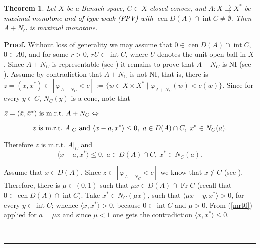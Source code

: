 \documentclass[english]{article}
\newtheorem{theorem}{Theorem}
\newenvironment{proof}[1][Proof]{\noindent\textbf{#1.} }{\ \rule{0.5em}{0.5em}}
\begin{document}
\begin{theorem} \label{T1}Let $X$ be a Banach space, $C\subset X$
closed convex, and $A:X\rightrightarrows X^{*}$ be \textcolor{black}{maximal
monotone and of type weak-(FPV) with} $\operatorname*{cen}D(A)\cap\operatorname*{int}C\neq\emptyset$.
Then $A+N_{C}$ is maximal monotone. \end{theorem}

\begin{proof} Without loss of generality we may assume that $0\in\operatorname*{cen}D(A)\cap\operatorname*{int}C$,
$0\in A0$, and for some $r>0$, $rU\subset\operatorname*{int}C$,
where $U$ denotes the unit open ball in $X$. Since $A+N_{C}$ is
representable (see \cite[Cor.\ 5.6]{tscr}) it remains to prove that
$A+N_{C}$ is NI (see \cite[Remark.\ 3.5]{tscr}). Assume by contradiction
that $A+N_{C}$ is not NI, that is, there is $z=(x,x^{*})\in[\varphi_{A+N_{C}}<c]:=\{w\in X\times X^{*}\mid\varphi_{A+N_{C}}(w)<c(w)\}$.
Since for every $y\in C$, $N_{C}(y)$ is a cone, note that

$\bar{z}=(\bar{x},\bar{x}^{*})\ {\rm is\ m.r.t.}\ A+N_{C}\Leftrightarrow$

\vspace{-.3cm}

\begin{equation}
\bar{z}\ {\rm is\ m.r.t.}\ A|_{C}\ {\rm and}\ \langle\bar{x}-a,x^{*}\rangle\le0,\ a\in D(A)\cap C,\ x^{*}\in N_{C}(a).\label{mrts}\end{equation}


Therefore $z$ is m.r.t. $A|_{C}$ and \begin{equation}
\langle x-a,x^{*}\rangle\le0,\ a\in D(A)\cap C,\ x^{*}\in N_{C}(a).\label{mrt0}\end{equation}


Assume that $x\in D(A)$. Since $z\in[\varphi_{A+N_{C}}<c]$
we know that $x\not\in C$ (see \cite[Prop.\ 2.1\ (d)]{tscr}). Therefore,
there is $\mu\in(0,1)$ such that $\mu x\in D(A)\cap\operatorname*{Fr}C$
(recall that $0\in\operatorname*{cen}D(A)\cap\operatorname*{int}C$).
Take $x^{*}\in N_{C}(\mu x)$, such that $\langle\mu x-y,x^{*}\rangle>0$,
for every $y\in\operatorname*{int}C$; whence $\langle x,x^{*}\rangle>0$,
because $0\in\operatorname*{int}C$ and $\mu>0$. From
(\ref{mrt0}) applied for $a=\mu x$ and since $\mu<1$ one gets the
contradiction $\langle x,x^{*}\rangle\le0$.


\end{proof}
\end{document}
